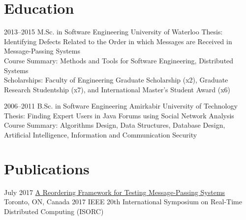 \documentclass[]{cv-style}                     %
\begin{document}
\section{Education}

\begin{entrylist}

  \entry
  {2013--2015}
  {M.Sc. in Software Engineering {\normalfont [GPA: 87.80/100]}}
  {University of Waterloo}
  {\small{Thesis: Identifying Defects Related to the Order in which Messages are Received in Message-Passing Systems \\
   Course Summary: Methods and Tools for Software Engineering, Distributed Systems \\ %
   Scholarships: Faculty of Engineering Graduate Scholarship (x2), Graduate Research Studentship (x7), and International Master's Student Award (x6)
   }}

  \entry
  {2006--2011}
  {B.Sc. in Software Engineering {\normalfont [GPA: 16.69/20]}}
  {Amirkabir University of Technology}
  {\small{Thesis: Finding Expert Users in Java Forums using Social Network Analysis \\
   Course Summary: Algorithms Design, Data Structures, Database Design, Artificial Intelligence, Information and Communication Security
   }}

\end{entrylist}



\section{Publications}

\begin{entrylist}

  \entry
  {July 2017}
  {\href{http://ieeexplore.ieee.org/abstract/document/7964877}{A Reordering Framework for Testing Message-Passing Systems}}
  {Toronto, ON, Canada}
  {\small{2017 IEEE 20th International Symposium on Real-Time Distributed Computing (ISORC)}}

\end{entrylist}
\end{document}
